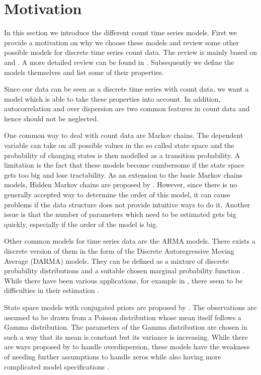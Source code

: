 \section{Motivation}
\label{sec:Ingarch Motivation}

In this section we introduce the different count time series models. First we provide a motivation on why we choose these models and review some other possible models for discrete time series count data. The review is mainly based on \cite{Liboschik:2016} and \cite{Heinen:2003}. A more detailed review can be found in \cite{Zucchini:1997}. Subsequently we define the models themselves and list some of their properties. 

Since our data can be seen as a discrete time series with count data, we want a model which is able to take these properties into account. In addition, autocorrelation and over dispersion are two common features in count data and hence should not be neglected.
 
One common way to deal with count data are Markov chains. The dependent variable can take on all possible values in the so called state space and the probability of changing states is then modelled as a transition probability. A limitation is the fact that these models become cumbersome if the state space gets too big and lose tractability. As an extension to the basic Markov chains models, Hidden Markov chains are proposed by \cite{Zucchini:1997}. However, since there is no generally accepted way to determine the order of this model, it can cause problems if the data structure does not provide intuitive ways to do it. Another issue is that the number of parameters which need to be estimated gets big quickly, especially if the order of the model is big. 

Other common models for time series data are the ARMA models. There exists a discrete version of them in the form of the Discrete Autoregressive Moving Average (DARMA) models. They can be defined as a mixture of discrete probability distributions and a suitable chosen marginal probability function \cite{Biswas:2009}. While there have been various applications, for example in \cite{Chang:1987}, there seem to be difficulties in their estimation \cite{Heinen:2003}. 

State space models with conjugated priors are proposed by \cite{Harvey:1989}. The observations are assumed to be drawn from a Poisson distribution whose mean itself follows a Gamma distribution. The parameters of the Gamma distribution are chosen in such a way that its mean is constant but its variance is increasing. While there are ways proposed by \cite{Qaqish:1988} to handle overdispersion, these models have the weakness of needing further assumptions to handle zeros while also having more complicated model specifications \cite{Heinen:2003}.

